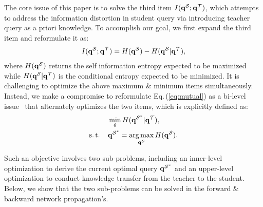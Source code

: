 \documentclass[10pt,twocolumn,letterpaper]{article}
\begin{document}
The core issue of this paper is to solve the third item $I({\bf q}^{\mathcal{S}}; {\bf q}^{\mathcal{T}})$, which attempts to address the information distortion in student query via introducing teacher query as a priori knowledge. To accomplish our goal, we first expand the third item and reformulate it as:
%
%
%
\begin{equation}
\begin{aligned}
I({\bf q}^{\mathcal{S}}; {\bf q}^{\mathcal{T}}) = H({\bf q}^{\mathcal{S}}) - H({\bf q}^{\mathcal{S}}|{\bf q}^{\mathcal{T}}), 
\end{aligned}
\label{eq:mutual}
\end{equation}
%
%
where $H({\bf q}^{\mathcal{S}})$ returns the self information entropy expected to be maximized while $H({\bf q}^{\mathcal{S}}|{\bf q}^{\mathcal{T}})$ is the conditional entropy expected to be minimized. 
%
%
It is challenging to optimize the above maximum \& minimum items simultaneously. Instead, we make a compromise to reformulate Eq.\,(\ref{eq:mutual}) as a bi-level issue~\cite{liu2021investigating,colson2007overview} that alternately optimizes the two items, which is explicitly defined as:
%
%
\begin{equation}
\begin{aligned}
& \mathop{\min}_{\theta}  H({\bf q}^{\mathcal{S}^*}|{\bf q}^{\mathcal{T}}), \\
\operatorname{s.t.} \;\;\;\; &{\bf q}^{\mathcal{S}^*} = \mathop{\arg \max}_{{\bf q}^{\mathcal{S}}} H({\bf q}^{\mathcal{S}}). 
\end{aligned}
\label{eq:bi-level}
\end{equation}


Such an objective involves two sub-problems, including an inner-level optimization to derive the current optimal query ${\bf q}^{\mathcal{S}^*}$ and an upper-level optimization to conduct knowledge transfer from the teacher to the student. Below, we show that the two sub-problems can be solved in the forward \& backward network propagation's.




% 
% 
% 
\end{document}
